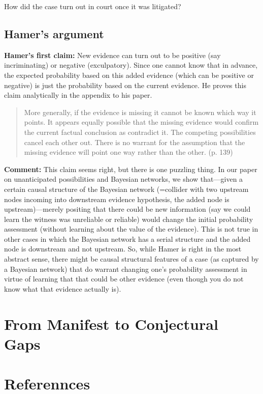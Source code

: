 \documentclass[
  10pt,
  dvipsnames,enabledeprecatedfontcommands]{scrartcl}
\begin{document}
How did the case turn out in court once it was litigated?

\hypertarget{hamers-argument}{%
\subsection{Hamer's argument}\label{hamers-argument}}

\textbf{Hamer's first claim:} New evidence can turn out to be positive
(say incriminating) or negative (exculpatory). Since one cannot know
that in advance, the expected probability based on this added evidence
(which can be positive or negative) is just the probability based on the
current evidence. He proves this claim analytically in the appendix to
his paper.

\begin{quote}
More generally, if the evidence is missing it cannot be known which way it points.
It appears equally possible that the missing evidence would confirm the current factual conclusion as
contradict it. The competing possibilities cancel each other out. There is no warrant for the assumption
that the missing evidence will point one way rather than the other. (p. 139)
\end{quote}

\textbf{Comment:} This claim seems right, but there is one puzzling
thing. In our paper on unanticipated possibilities and Bayesian
networks, we show that---given a certain causal structure of the
Bayesian network (=collider with two upstream nodes incoming into
downstream evidence hypothesis, the added node is upstream)---merely
positing that there could be new information (say we could learn the
witness was unreliable or reliable) would change the initial probability
assessment (without learning about the value of the evidence). This is
not true in other cases in which the Bayesian network has a serial
structure and the added node is downstream and not upstream. So, while
Hamer is right in the most abstract sense, there might be causal
structural features of a case (as captured by a Bayesian network) that
do warrant changing one's probability assessment in virtue of learning
that that could be other evidence (even though you do not know what that
evidence actually is).

\hypertarget{from-manifest-to-conjectural-gaps}{%
\section{From Manifest to Conjectural
Gaps}\label{from-manifest-to-conjectural-gaps}}

\hypertarget{referennces}{%
\section{Referennces}\label{referennces}}
\end{document}
